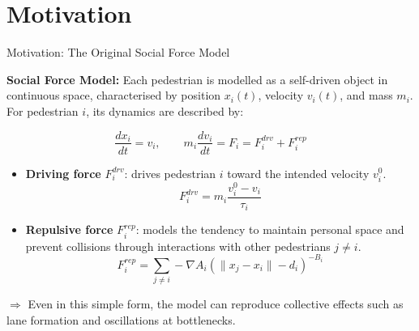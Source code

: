\documentclass{beamer}
\begin{document}
\section{Motivation}

\begin{frame}{Motivation: The Original Social Force Model}

\small
\raggedright

\setlength{\abovedisplayskip}{4pt}
\setlength{\belowdisplayskip}{4pt}
\setlength{\abovedisplayshortskip}{2pt}
\setlength{\belowdisplayshortskip}{2pt}

\vspace{0.10cm}

\textbf{Social Force Model:} Each pedestrian is modelled as a self-driven object in
continuous space, characterised by position $x_i(t)$, velocity $v_i(t)$,
and mass $m_i$.\\
For pedestrian $i$, its dynamics are described by:

\[
    \frac{dx_i}{dt}=v_i,
    \qquad
    m_i\frac{dv_i}{dt}=F_i
    =
    F_i^{drv}+F_i^{rep}
\]

\begin{itemize}
    \setlength{\itemsep}{4pt}
    \setlength{\topsep}{2pt}

    \item \textbf{Driving force} $F_i^{drv}$:
    drives pedestrian $i$ toward the intended velocity $v_i^0$.
    \[
        F_i^{drv}
        =
        m_i\frac{v_i^0-v_i}{\tau_i}
    \]

    \item \textbf{Repulsive force} $F_i^{rep}$:
    models the tendency to maintain personal space and prevent collisions
    through interactions with other pedestrians $j\neq i$.
    \[
        F_i^{rep}
        =
        \sum_{j\neq i}
        -\nabla
        A_i
            (\lVert x_j-x_i\rVert - d_i)^{-B_i}
    \]
\end{itemize}

\vspace{-0.05cm}

$\Rightarrow$ Even in this simple form, the model can reproduce collective
effects such as lane formation and oscillations at bottlenecks.

\end{frame}
\end{document}
